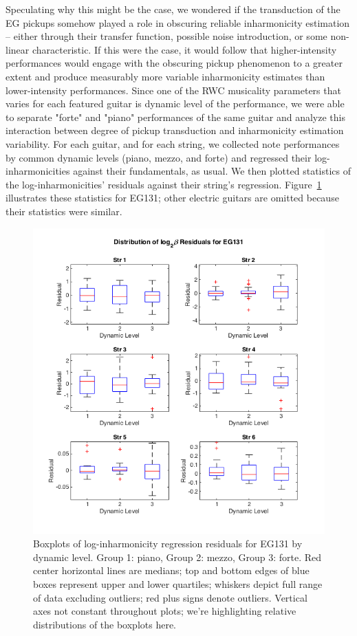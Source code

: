 \documentclass[12pt]{cmuthesis}
\begin{document}
Speculating why this might be the case, we wondered if the transduction of the EG pickups somehow played a role in obscuring reliable inharmonicity estimation -- either through their transfer function, possible noise introduction, or some non-linear characteristic. If this were the case, it would follow that higher-intensity performances would engage with the obscuring pickup phenomenon to a greater extent and produce measurably more variable inharmonicity estimates than lower-intensity performances. Since one of the RWC musicality parameters that varies for each featured guitar is dynamic level of the performance, we were able to separate "forte" and "piano" performances of the same guitar and analyze this interaction between degree of pickup transduction and inharmonicity estimation variability. For each guitar, and for each string, we collected note performances by common dynamic levels (piano, mezzo, and forte) and regressed their log-inharmonicities against their fundamentals, as usual. We then plotted statistics of the log-inharmonicities' residuals against their string's regression. Figure~\ref{fig:eg1-string-dyn} illustrates these statistics for EG131; other electric guitars are omitted because their statistics were similar.
\begin{figure}[!htbp] 
\label{fig:eg1-string-dyn}
\centering
\includegraphics[scale=0.75]{eg1-string-dyn}
\caption{Boxplots of log-inharmonicity regression residuals for EG131 by dynamic level. Group 1: piano, Group 2: mezzo, Group 3: forte. Red center horizontal lines are medians; top and bottom edges of blue boxes represent upper and lower quartiles; whiskers depict full range of data excluding outliers; red plus signs denote outliers. Vertical axes not constant throughout plots; we're highlighting relative distributions of the boxplots here.}
\end{figure} 
\end{document}
